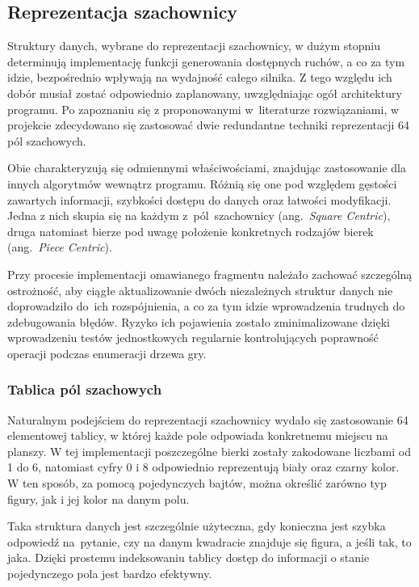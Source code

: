 \subsection{Reprezentacja szachownicy}
\label{subsec:reprezentacja-szachownicy}

Struktury danych, wybrane do reprezentacji szachownicy, w dużym stopniu determinują implementację funkcji generowania dostępnych ruchów, a co za tym idzie, bezpośrednio wpływają na wydajność całego silnika.
Z tego względu ich dobór musiał zostać odpowiednio zaplanowany, uwzględniając ogół architektury programu.
Po zapoznaniu się z proponowanymi w~literaturze rozwiązaniami, w projekcie zdecydowano się zastosować dwie redundantne techniki reprezentacji 64 pól szachowych.

Obie charakteryzują się odmiennymi właściwościami, znajdując zastosowanie dla innych algorytmów wewnątrz programu.
Różnią się one pod względem gęstości zawartych informacji, szybkości dostępu do danych oraz łatwości modyfikacji.
Jedna z nich skupia się na każdym z~pól~szachownicy (ang.~\emph{Square Centric}), druga natomiast bierze pod uwagę położenie konkretnych rodzajów bierek (ang.~\emph{Piece Centric}).

Przy procesie implementacji omawianego fragmentu należało zachować szczególną ostrożność, aby ciągłe aktualizowanie dwóch niezależnych struktur danych nie doprowadziło do~ich rozspójnienia, a co za tym idzie wprowadzenia trudnych do zdebugowania błędów.
Ryzyko ich pojawienia zostało zminimalizowane dzięki wprowadzeniu testów jednostkowych regularnie kontrolujących poprawność operacji podczas enumeracji drzewa gry.
\subsubsection{Tablica pól szachowych}

Naturalnym podejściem do reprezentacji szachownicy wydało się zastosowanie 64 elementowej tablicy, w której każde pole odpowiada konkretnemu miejscu na planszy.
W tej implementacji poszczególne bierki zostały zakodowane liczbami od 1 do 6, natomiast cyfry 0 i 8 odpowiednio reprezentują biały oraz czarny kolor.
W ten sposób, za pomocą pojedynczych bajtów, można określić zarówno typ figury, jak i jej kolor na danym polu.

Taka struktura danych jest szczególnie użyteczna, gdy konieczna jest szybka odpowiedź na~pytanie, czy na danym kwadracie znajduje się figura, a jeśli tak, to jaka.
Dzięki prostemu indeksowaniu tablicy dostęp do informacji o stanie pojedynczego pola jest bardzo efektywny.

